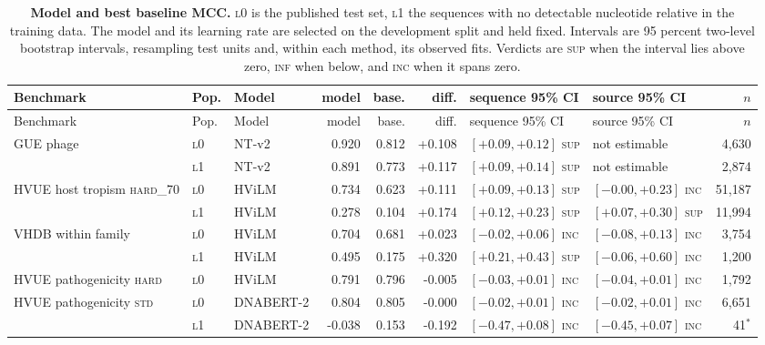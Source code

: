 \begingroup\scriptsize\setlength{\tabcolsep}{1.9pt}
\begin{longtable}{ll l rr r ll r}
\caption{\textbf{Model and best baseline MCC.} \textsc{l0} is the published test set, \textsc{l1} the sequences with no detectable nucleotide relative in the training data. The model and its learning rate are selected on the development split and held fixed. Intervals are 95 percent two-level bootstrap intervals, resampling test units and, within each method, its observed fits. Verdicts are \textsc{sup} when the interval lies above zero, \textsc{inf} when below, and \textsc{inc} when it spans zero.}
\label{tab:headtohead}\\
\toprule
Benchmark & Pop. & Model & model & base. & diff. & sequence 95\% CI & source 95\% CI & $n$ \\
\midrule\endfirsthead
\toprule Benchmark & Pop. & Model & model & base. & diff. & sequence 95\% CI & source 95\% CI & $n$ \\ \midrule \endhead
GUE phage & \textsc{l0} & NT-v2 & 0.920 & 0.812 & +0.108 & $[+0.09, +0.12]$ \textsc{sup} & not estimable & 4,630 \\
 & \textsc{l1} & NT-v2 & 0.891 & 0.773 & +0.117 & $[+0.09, +0.14]$ \textsc{sup} & not estimable & 2,874 \\
\addlinespace
HVUE host tropism \textsc{hard\_70} & \textsc{l0} & HViLM & 0.734 & 0.623 & +0.111 & $[+0.09, +0.13]$ \textsc{sup} & $[-0.00, +0.23]$ \textsc{inc} & 51,187 \\
 & \textsc{l1} & HViLM & 0.278 & 0.104 & +0.174 & $[+0.12, +0.23]$ \textsc{sup} & $[+0.07, +0.30]$ \textsc{sup} & 11,994 \\
\addlinespace
VHDB within family & \textsc{l0} & HViLM & 0.704 & 0.681 & +0.023 & $[-0.02, +0.06]$ \textsc{inc} & $[-0.08, +0.13]$ \textsc{inc} & 3,754 \\
 & \textsc{l1} & HViLM & 0.495 & 0.175 & +0.320 & $[+0.21, +0.43]$ \textsc{sup} & $[-0.06, +0.60]$ \textsc{inc} & 1,200 \\
\addlinespace
HVUE pathogenicity \textsc{hard} & \textsc{l0} & HViLM & 0.791 & 0.796 & -0.005 & $[-0.03, +0.01]$ \textsc{inc} & $[-0.04, +0.01]$ \textsc{inc} & 1,792 \\
\addlinespace
HVUE pathogenicity \textsc{std} & \textsc{l0} & DNABERT-2 & 0.804 & 0.805 & -0.000 & $[-0.02, +0.01]$ \textsc{inc} & $[-0.02, +0.01]$ \textsc{inc} & 6,651 \\
 & \textsc{l1} & DNABERT-2 & -0.038 & 0.153 & -0.192 & $[-0.47, +0.08]$ \textsc{inc} & $[-0.45, +0.07]$ \textsc{inc} & 41$^{*}$ \\

\end{longtable}

